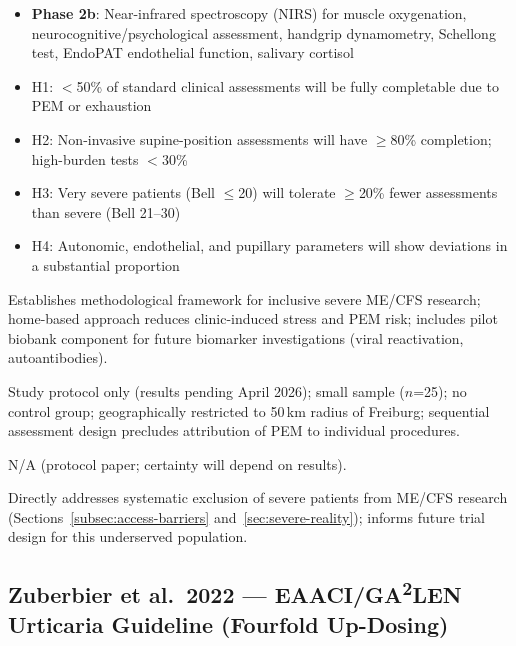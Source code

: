 \begin{description}
\begin{itemize}
        \item \textbf{Phase 2b}: Near-infrared spectroscopy (NIRS) for muscle oxygenation, neurocognitive/psychological assessment, handgrip dynamometry, Schellong test, EndoPAT endothelial function, salivary cortisol
    \end{itemize}
    \item[Primary Hypotheses:]
    \begin{itemize}
        \item H1: $<$50\% of standard clinical assessments will be fully completable due to PEM or exhaustion
        \item H2: Non-invasive supine-position assessments will have $\geq$80\% completion; high-burden tests $<$30\%
        \item H3: Very severe patients (Bell $\leq$20) will tolerate $\geq$20\% fewer assessments than severe (Bell 21--30)
        \item H4: Autonomic, endothelial, and pupillary parameters will show deviations in a substantial proportion
    \end{itemize}
    \item[Significance:] Establishes methodological framework for inclusive severe ME/CFS research; home-based approach reduces clinic-induced stress and PEM risk; includes pilot biobank component for future biomarker investigations (viral reactivation, autoantibodies).
    \item[Limitations:] Study protocol only (results pending April 2026); small sample ($n$=25); no control group; geographically restricted to 50\,km radius of Freiburg; sequential assessment design precludes attribution of PEM to individual procedures.
    \item[Certainty:] N/A (protocol paper; certainty will depend on results).
    \item[Relevance:] Directly addresses systematic exclusion of severe patients from ME/CFS research (Sections~\ref{subsec:access-barriers} and~\ref{sec:severe-reality}); informs future trial design for this underserved population.
\end{description}

\subsection{Zuberbier et al.\ 2022 --- EAACI/GA\textsuperscript{2}LEN Urticaria Guideline (Fourfold Up-Dosing)}

